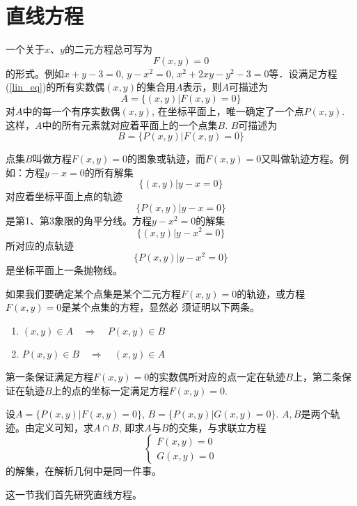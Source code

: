 \section{直线方程}
一个关于$x$、$y$的二元方程总可写为
\begin{equation}\label{lin_eq}
 F (x,y) =0   
\end{equation}
的形式。例如$x+y-3=0$, $y-x^2=0$, $x^2+2xy-y^2-3=0$等．设满足方程(\ref{lin_eq})的所有实数偶$(x,y)$的集合用$A$表示，则$A$可描述为
\[A= \{ (x,y) |F (x,y) =0\} \]
对$A$中的每一个有序实数偶$(x,y)$, 在坐标平面上，唯一确定了一个点$P(x,y)$. 这样，$A$中的所有元素就对应着平面上的一个点集$B$. $B$可描述为
\[B= \{P (x,y) |F (x,y) =0\}\]

点集$B$叫做方程$F(x,y)=0$的图象或轨迹，而$F(x,y)=0$又叫做轨迹方程。例如：方程$y-x=0$的所有解集
\[\{ (x,y) |y-x=0\}\]
对应着坐标平面上点的轨迹
\[\{P (x,y) |y-x=0\} \]
是第1、第3象限的角平分线。方程$y-x^2=0$的解集
\[\{ (x,y) |y-x^2=0\}\]
所对应的点轨迹
\[\{P (x,y) |y-x^2=0\}\]
是坐标平面上一条抛物线。

如果我们要确定某个点集是某个二元方程$F(x,y)=0$的轨迹，或方程$F(x,y)=0$是某个点集的方程，显然必
须证明以下两条。
\begin{enumerate}
    \item $(x,y)\in A\quad \Rightarrow\quad P(x,y)\in B$
    \item $P (x,y) \in B\quad \Rightarrow\quad  (x,y) \in A$
\end{enumerate}
第一条保证满足方程$F(x,y)=0$的实数偶所对应的点一定在轨迹$B$上，第二条保证在轨迹$B$上的点的坐标一定满足方程$F(x,y)=0$.

设$A= \{P (x,y) |F (x,y) =0\}$, $B= \{P (x,y) |G (x,y) =0\}$. 
$A,B$是两个轨迹。由定义可知，求$A\cap B$, 即求$A$与$B$的交集，与求联立方程
\[\begin{cases}
   F (x,y) =0\\
   G (x,y) =0 
\end{cases}\]
的解集，在解析几何中是同一件事。

这一节我们首先研究直线方程。






























